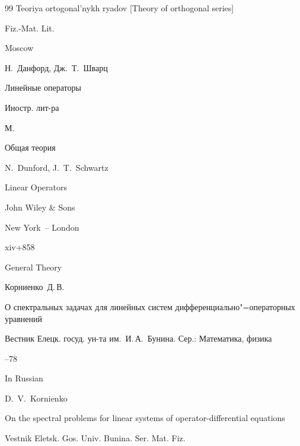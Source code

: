 \begin{thebibliography}{99}
\book Teoriya ortogonal'nykh ryadov \rm [Theory of orthogonal series]


\publ Fiz.-Mat. Lit.

\publaddr Moscow







\by Н.~Данфорд, Дж.~Т.~Шварц

\book Линейные операторы


\publ Иностр. лит-ра

\publaddr М.



\volinfo Общая теория

\transl

\by N.~Dunford, J.~T.~Schwartz

\book Linear Operators


\publ John Wiley \& Sons

\publaddr New York~– London


\totalpages xiv+858

\volinfo General Theory






\by Корниенко~Д.\,В.

\paper О спектральных задачах для линейных систем дифференциально"=операторных уравнений

\jour Вестник Елецк. госуд. ун-та им.~И.\,А.~Бунина. Сер.: Математика, физика



--78

\misctransl 

\lang In Russian

\by D.~V.~Kornienko

\paper On the spectral problems for linear systems of operator-differential equations

\jour Vestnik Eletsk. Gos. Univ. Bunina. Ser. Mat. Fiz.




\end{thebibliography}
